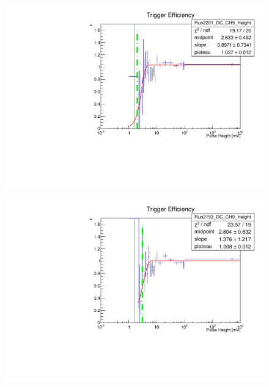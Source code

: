 \documentclass[12pt]{article}
\begin{document}
\begin{figure}[t!]
\centering
\begin{minipage}{.55\textwidth}
  \centering
  \includegraphics[width=1.\linewidth]{figures/triggerEfficiency/Efficiency_Run2201_DC_CH9_Height_vs_Run2191_SC_CH9_Height}
  \label{fig:turnon1}
\end{minipage}%
\begin{minipage}{.55\textwidth}
  \centering
  \includegraphics[width=1.\linewidth]{figures/triggerEfficiency/Efficiency_Run2193_DC_CH9_Height_vs_Run2191_SC_CH9_Height}
  \label{fig:turnon2}
\end{minipage}

\end{figure}
\end{document}
